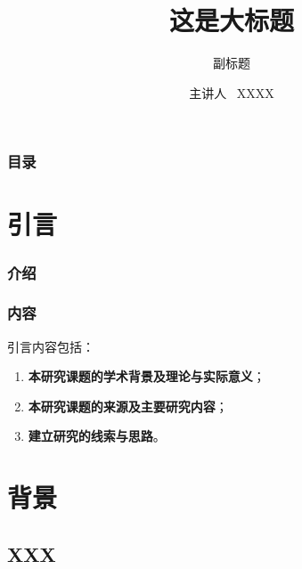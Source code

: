 \documentclass[AutoFakeBold,AutoFakeSlant]{beamer}
\title[这里修改为你的课题（建议与标题一致）]{
  这是大标题} %
\subtitle{副标题} %
\institute[Sun Yat-Sen University]{
  中山大学 \\ 物理与天文学院
  }
\date[\today]{\ctoday}
\begin{document}
\author[netid@mail2.sysu.edu.cn]{
  主讲人  \ XXXX
  \texorpdfstring{\\}{XXX}
}

\begin{frame}
  \titlepage
\end{frame}
\setcounter{framenumber}{0}

\begin{frame}
  \frametitle{目\quad 录}
  \tableofcontents[hideallsubsections]
\end{frame}

\section{引言}

\begin{frame}
  \frametitle{介绍}

\end{frame}

\begin{frame}
  \frametitle{内容}

  引言内容包括：
  \begin{enumerate}
    \item \textbf{本研究课题的学术背景及理论与实际意义}；
    \item \textbf{本研究课题的来源及主要研究内容}；
    \item \textbf{建立研究的线索与思路}。
  \end{enumerate}

\end{frame}

\section{背景}

\subsection{XXX}
\end{document}
